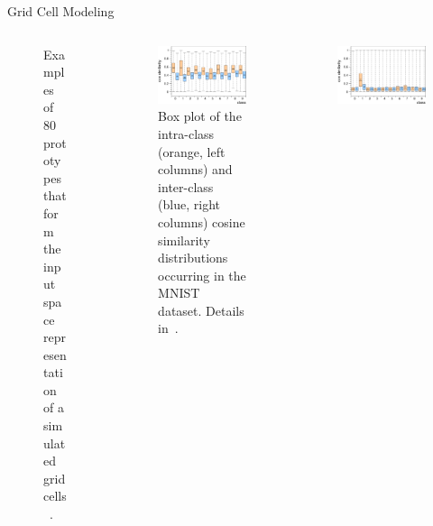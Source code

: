 \begin{frame}{Grid Cell Modeling }
\begin{columns}[t]
\begin{column}{0.2\textwidth}
\begin{figure}
\vspace{0.6em}
\caption{\justifying\scriptsize Examples of 80 prototypes that form the input space 
representation of a simulated grid cells~\cite{kerdels2017}.}
\end{figure}
\end{column}
\begin{column}{0.35\textwidth}
\begin{figure}
\includegraphics[width=\linewidth]{diss/MNIST_dist.jpg}

\vspace{-0.5em}
\caption{\justifying\scriptsize Box plot of the intra-class (orange, left 
columns) and inter-class (blue, right columns) cosine similarity distributions 
occurring in the MNIST dataset. Details in~\cite{kerdels2017}.}
\end{figure}
\end{column}
\begin{column}{0.35\textwidth}
\begin{figure}
\includegraphics[width=\linewidth]{diss/all_80.jpg}


\end{figure}
\end{column}
\end{columns}
\end{frame}
